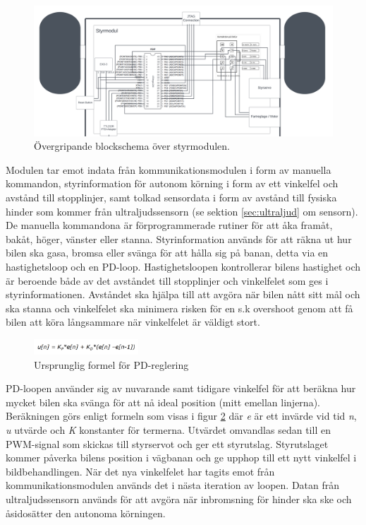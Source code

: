 \documentclass[10pt,oneside,swedish]{lips}
\begin{document}
\begin{figure}[htbp]
  \centering
  \includegraphics[width=1\textwidth]{./Figures/detalj_styrmodul.png}
  \caption{Övergripande blockschema över styrmodulen.}
  \label{fig:detalj_styrmodul.png}
\end{figure}

Modulen tar emot indata från kommunikationsmodulen i form av manuella kommandon, styrinformation för autonom körning i form av ett vinkelfel och avstånd till stopplinjer, samt tolkad sensordata i form av avstånd till fysiska hinder som kommer från ultraljudssensorn (se sektion \ref{sec:ultraljud} om sensorn). 
De manuella kommandona är förprogrammerade rutiner för att åka framåt, bakåt, höger, vänster eller stanna. 
Styrinformation används för att räkna ut hur bilen ska gasa, bromsa eller svänga för att hålla sig på banan, detta via en hastighetsloop och en PD-loop. Hastighetsloopen kontrollerar bilens hastighet och är beroende både av det avståndet till stopplinjer och vinkelfelet som ges i styrinformationen. Avståndet ska hjälpa till att avgöra när bilen nått sitt mål och ska stanna och vinkelfelet ska minimera risken för en s.k overshoot genom att få bilen att köra långsammare när vinkelfelet är väldigt stort.

\begin{figure}[htbp]
  \centering
  \includegraphics[width=0.35\textwidth]{./Figures/PD_formula.png}
  \caption{Ursprunglig formel för PD-reglering}
  \label{fig:PD.png}
\end{figure}

PD-loopen använder sig av nuvarande samt tidigare vinkelfel för att beräkna hur mycket bilen ska svänga för att nå ideal position (mitt emellan linjerna). Beräkningen görs enligt formeln som visas i figur \ref{fig:PD.png} där \textit{e} är ett invärde vid tid \textit{n}, \textit{u} utvärde och \textit{K} konstanter för termerna. Utvärdet omvandlas sedan till en PWM-signal som skickas till styrservot och ger ett styrutslag. Styrutslaget kommer påverka bilens position i vägbanan och ge upphop till ett nytt vinkelfel i bildbehandlingen. När det nya vinkelfelet har tagits emot från kommunikationsmodulen används det i nästa iteration av loopen.
Datan från ultraljudssensorn används för att avgöra när inbromsning för hinder ska ske och åsidosätter den autonoma körningen.
\clearpage
\end{document}
